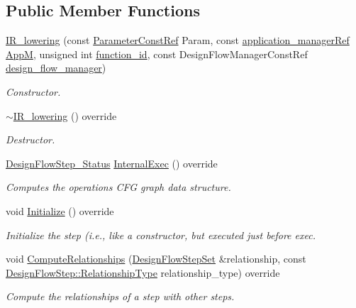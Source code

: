 \subsection*{Public Member Functions}
\begin{DoxyCompactItemize}
\item 
\hyperlink{classIR__lowering_a793abcd993d95ad4aea585c60c96ed3c}{I\+R\+\_\+lowering} (const \hyperlink{Parameter_8hpp_a37841774a6fcb479b597fdf8955eb4ea}{Parameter\+Const\+Ref} Param, const \hyperlink{application__manager_8hpp_a04ccad4e5ee401e8934306672082c180}{application\+\_\+manager\+Ref} \hyperlink{classFrontendFlowStep_a0ac0d8db2a378416583f51c4faa59d15}{AppM}, unsigned int \hyperlink{classFunctionFrontendFlowStep_a58ef2383ad1a212a8d3f396625a4b616}{function\+\_\+id}, const Design\+Flow\+Manager\+Const\+Ref \hyperlink{classDesignFlowStep_ab770677ddf087613add30024e16a5554}{design\+\_\+flow\+\_\+manager})
\begin{DoxyCompactList}\small\item\em Constructor. \end{DoxyCompactList}\item 
\hyperlink{classIR__lowering_a714d425fd2cb725e5cc9ec803410b510}{$\sim$\+I\+R\+\_\+lowering} () override
\begin{DoxyCompactList}\small\item\em Destructor. \end{DoxyCompactList}\item 
\hyperlink{design__flow__step_8hpp_afb1f0d73069c26076b8d31dbc8ebecdf}{Design\+Flow\+Step\+\_\+\+Status} \hyperlink{classIR__lowering_a96415d3fb04f24946a5fb657db8a8e22}{Internal\+Exec} () override
\begin{DoxyCompactList}\small\item\em Computes the operations C\+FG graph data structure. \end{DoxyCompactList}\item 
void \hyperlink{classIR__lowering_a88ed11612162d524f892e9329b36380d}{Initialize} () override
\begin{DoxyCompactList}\small\item\em Initialize the step (i.\+e., like a constructor, but executed just before exec. \end{DoxyCompactList}\item 
void \hyperlink{classIR__lowering_a47d1e16e6d42ddac272d166329013fd4}{Compute\+Relationships} (\hyperlink{classDesignFlowStepSet}{Design\+Flow\+Step\+Set} \&relationship, const \hyperlink{classDesignFlowStep_a723a3baf19ff2ceb77bc13e099d0b1b7}{Design\+Flow\+Step\+::\+Relationship\+Type} relationship\+\_\+type) override
\begin{DoxyCompactList}\small\item\em Compute the relationships of a step with other steps. \end{DoxyCompactList}\end{DoxyCompactItemize}
